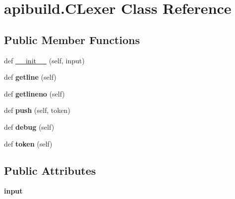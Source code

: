\hypertarget{classapibuild_1_1_c_lexer}{}\section{apibuild.\+C\+Lexer Class Reference}
\label{classapibuild_1_1_c_lexer}
\subsection*{Public Member Functions}
\begin{DoxyCompactItemize}
\item 
def \mbox{\hyperlink{classapibuild_1_1_c_lexer_a9a072c7ed49420b911dc439e77c12512}{\+\_\+\+\_\+init\+\_\+\+\_\+}} (self, input)
\item 
\mbox{\label{classapibuild_1_1_c_lexer_aee88811e06ea50415385ff971e0c758e}} 
def {\bfseries getline} (self)
\item 
\mbox{\label{classapibuild_1_1_c_lexer_a2834a75b982e8f10f412c20b6363833e}} 
def {\bfseries getlineno} (self)
\item 
\mbox{\label{classapibuild_1_1_c_lexer_acdf29198abfed6a91fd380447fc95a56}} 
def {\bfseries push} (self, token)
\item 
\mbox{\label{classapibuild_1_1_c_lexer_a4c8f239e76e4dd3e5753d47353f5c6cf}} 
def {\bfseries debug} (self)
\item 
\mbox{\label{classapibuild_1_1_c_lexer_ad83a876d1a689155c6e37a96f85809da}} 
def {\bfseries token} (self)
\end{DoxyCompactItemize}
\subsection*{Public Attributes}
\begin{DoxyCompactItemize}
\item 
\mbox{\label{classapibuild_1_1_c_lexer_a3ceaea3f50bcefe430fb38268950cadb}} 
{\bfseries input}
\end{DoxyCompactItemize}
